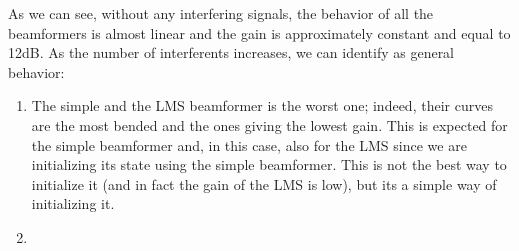 As we can see, without any interfering signals, the behavior of all the beamformers is almost linear and the gain is 
approximately constant and equal to 12dB.
As the number of interferents increases, we can identify as general behavior:

\begin{enumerate}
    \item The simple and the LMS beamformer is the worst one; indeed, their curves are the most bended and the 
            ones giving the lowest gain. This is expected for the simple beamformer and, in this case, also for the LMS
            since we are initializing its state using the simple beamformer. This is not the best way to initialize it (and
            in fact the gain of the LMS is low), but its a simple way of initializing it.
    \item 
\end{enumerate}